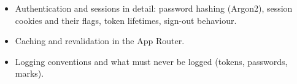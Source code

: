 \begin{todo}
  \begin{itemize}
    \item Authentication and sessions in detail: password hashing (Argon2), session cookies and
      their flags, token lifetimes, sign-out behaviour.
    \item Caching and revalidation in the App Router.
    \item Logging conventions and what must never be logged (tokens, passwords, marks).
  \end{itemize}
\end{todo}
